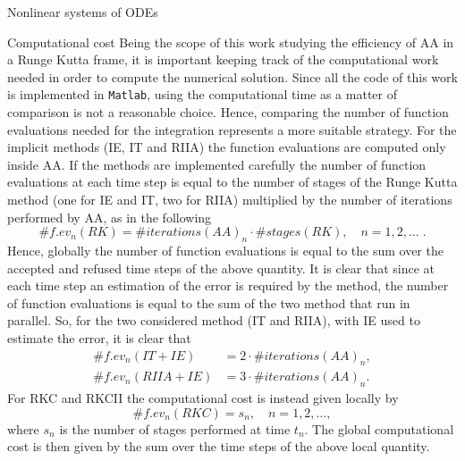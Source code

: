 \documentclass{article}
\begin{document}
\begin{section}{Nonlinear systems of ODEs}
\begin{subsection}{Computational cost}
Being the scope of this work studying the efficiency of AA in a Runge Kutta frame, it is important keeping track of the computational work needed in order to compute the numerical solution. Since all the code of this work is implemented in \texttt{Matlab}, using the computational time as a matter of comparison is not a reasonable choice. Hence, comparing the number of function evaluations needed for the integration represents a more suitable strategy. For the implicit methods (IE, IT and RIIA) the function evaluations are computed only inside AA. If the methods are implemented carefully the number of function evaluations at each time step is equal to the number of stages of the Runge Kutta method (one for IE and IT, two for RIIA) multiplied by the number of iterations performed by AA, as in the following
\begin{equation*}
	\#f.ev_n(RK) = \#iterations(AA)_n \cdot \#stages(RK), \quad n = 1,2,\dots \; .
\end{equation*}
Hence, globally the number of function evaluations is equal to the sum over the accepted and refused time steps of the above quantity. It is clear that since at each time step an estimation of the error is required by the method, the number of function evaluations is equal to the sum of the two method that run in parallel. So, for the two considered method (IT and RIIA), with IE used to estimate the error, it is clear that 
\begin{align*}
	\#f.ev_n(IT + IE) &= 2\cdot\#iterations(AA)_n, \\
	\#f.ev_n(RIIA + IE) &= 3\cdot\#iterations(AA)_n.
\end{align*}
For RKC and RKCII the computational cost is instead given locally by 
\begin{equation*}
	\#f.ev_n(RKC) = s_n, \quad n = 1,2,\dots,
\end{equation*}
where $s_n$ is the number of stages performed at time $t_n$. The global computational cost is then given by the sum over the time steps of the above local quantity.
\end{subsection}


\end{section}
\end{document}
